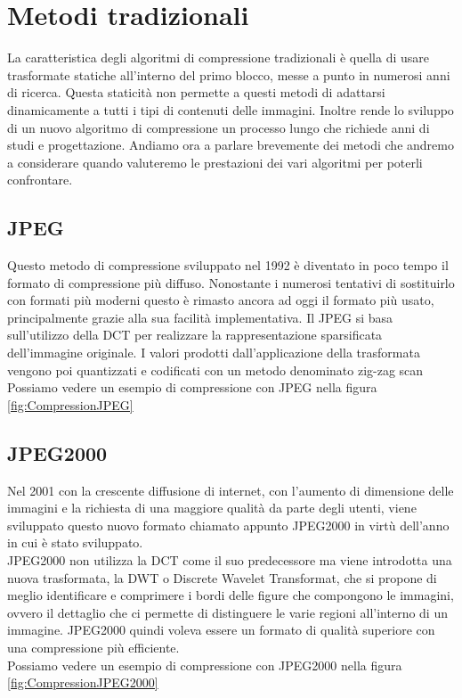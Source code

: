 \chapter{Metodi tradizionali}
La caratteristica degli algoritmi di compressione tradizionali è quella di usare trasformate statiche all’interno del primo blocco, messe a punto in numerosi anni di ricerca. Questa staticità non permette a questi metodi di adattarsi dinamicamente a tutti i tipi di contenuti delle immagini. Inoltre rende lo sviluppo di un nuovo algoritmo di compressione un processo lungo che richiede anni di studi e progettazione. \cite{ cheng2018deep}
Andiamo ora a parlare brevemente dei metodi che andremo a considerare quando valuteremo le prestazioni dei vari algoritmi per poterli confrontare.

\section{JPEG}
Questo metodo di compressione sviluppato nel 1992 è diventato in poco tempo il formato di compressione più diffuso. Nonostante i numerosi tentativi di sostituirlo con formati più moderni questo è rimasto ancora ad oggi il formato più usato, principalmente grazie alla sua facilità implementativa. Il JPEG si basa sull’utilizzo della DCT per realizzare la rappresentazione sparsificata dell’immagine originale. I valori prodotti dall'applicazione della trasformata vengono poi quantizzati e codificati con un metodo denominato zig-zag scan \cite{ 125072} \\
Possiamo vedere un esempio di compressione con JPEG nella figura \ref*{fig:CompressionJPEG}

\section{JPEG2000}
Nel 2001 con la crescente diffusione di internet, con l’aumento di dimensione delle immagini e la richiesta di una maggiore qualità da parte degli utenti, viene sviluppato questo nuovo formato chiamato appunto JPEG2000 in virtù dell'anno in cui è stato sviluppato.\\
JPEG2000 non utilizza la DCT come il suo predecessore ma viene introdotta una nuova trasformata, la DWT o Discrete Wavelet Transformat, che si propone di meglio identificare e comprimere i bordi delle figure che compongono le immagini, ovvero il dettaglio che ci permette di distinguere le varie regioni all'interno di un immagine.
JPEG2000 quindi voleva essere un formato di qualità superiore con una compressione più efficiente.\cite{952804}\\
Possiamo vedere un esempio di compressione con JPEG2000 nella figura \ref*{fig:CompressionJPEG2000}

